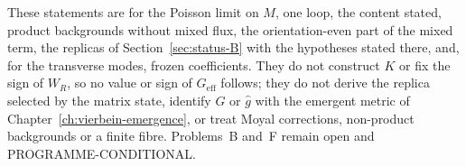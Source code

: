 These statements are for the Poisson limit on \(M\), one loop, the content stated, product backgrounds without mixed flux, the orientation-even part of the mixed term, the replicas of Section~\ref{sec:status-B} with the hypotheses stated there, and, for the transverse modes, frozen coefficients. They do not construct \(K\) or fix the sign of \(W_R\), so no value or sign of \(G_{\mathrm{eff}}\) follows; they do not derive the replica selected by the matrix state, identify \(G\) or \(\hat g\) with the emergent metric of Chapter~\ref{ch:vierbein-emergence}, or treat Moyal corrections, non-product backgrounds or a finite fibre. Problems~B and~F remain open and PROGRAMME-CONDITIONAL.
